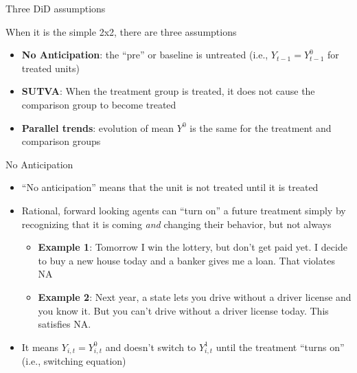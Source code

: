 \documentclass{beamer}
\begin{document}
\begin{frame}{Three DiD assumptions}

When it is the simple 2x2, there are three assumptions
\begin{itemize}
\item \textbf{No Anticipation}:  the ``pre'' or baseline is untreated (i.e., $Y_{t-1} = Y^0_{t-1}$ for treated units)
\item \textbf{SUTVA}: When the treatment group is treated, it does not cause the comparison group to become treated
\item \textbf{Parallel trends}:  evolution of mean $Y^0$ is the same for the treatment and comparison groups
\end{itemize}

\end{frame}



\begin{frame}{No Anticipation}

\begin{itemize}
\item  ``No anticipation''  means that the unit is not treated until it is treated
\item Rational, forward looking agents can ``turn on'' a future treatment simply by recognizing that it is coming \emph{and} changing their behavior, but not always
	\begin{itemize}
	\item \textbf{Example 1}: Tomorrow I win the lottery, but don't get paid yet. I decide to buy a new house today and a banker gives me a loan. That violates NA
	\item \textbf{Example 2}: Next year, a state lets you drive without a driver license and you know it. But you can't drive without a driver license today.  This satisfies NA.
	\end{itemize}
\item It means $Y_{i,t}=Y^0_{i,t}$ and doesn't switch to $Y^1_{i,t}$ until the treatment ``turns on'' (i.e., switching equation)

\end{itemize}


\end{frame}
\end{document}
